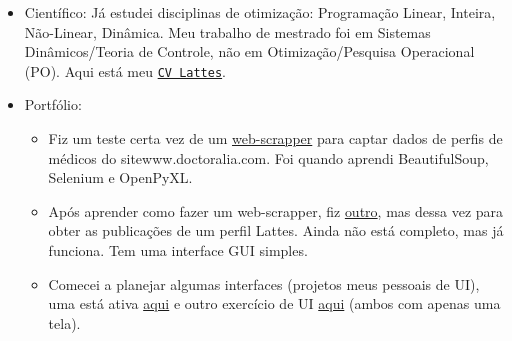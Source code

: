 \documentclass[11pt]{article}
\begin{document}
\begin{itemize}
\item Científico: Já estudei disciplinas de otimização: Programação Linear, Inteira, Não-Linear, Dinâmica. Meu trabalho de mestrado foi em Sistemas Dinâmicos/Teoria de Controle, não em Otimização/Pesquisa Operacional (PO).
Aqui está meu \href{http://lattes.cnpq.br/3866983332299702}{\texttt{CV Lattes}}.

\item Portfólio: 
\begin{itemize}
\item Fiz um teste certa vez de um \href{https://github.com/j5r/web-scrapper-doctoralia}{web-scrapper} para captar dados de perfis de médicos do site\linebreak www.doctoralia.com. Foi quando aprendi BeautifulSoup, Selenium e OpenPyXL.
\item Após aprender como fazer um web-scrapper, fiz \href{https://github.com/j5r/web-scrapper-lattes-productions}{outro}, mas dessa vez para obter as publicações de um perfil Lattes. Ainda não está completo, mas já funciona. Tem uma interface GUI simples.
\item Comecei a planejar algumas interfaces (projetos meus pessoais de UI), uma está ativa \href{http://tiny.cc/gaussiana}{aqui} e outro  exercício de UI \href{https://www.figma.com/file/6GPxOdQId3RAmG0TPksVMO/julhes?node-id=0%3A1}{aqui} (ambos com apenas uma tela).
\end{itemize}

\end{itemize}
\end{document}
